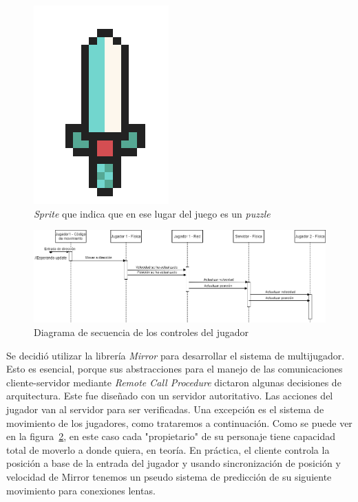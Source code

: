 \begin{figure}[H]
    \centering
    \includegraphics[scale=0.5]{images/espada_sprite.png}
    \caption{\textit{Sprite} que indica que en ese lugar del juego es un \textit{puzzle}}
    \label{fig:puzzle_location}
\end{figure}

\begin{figure}[H]
    \centering
    \includegraphics[width=1\linewidth]{images/diagrama_secuencia_movimientos.png}
    \caption{Diagrama de secuencia de los controles del jugador}
    \label{fig:diagrama_sec_movimiento}
\end{figure}

Se decidió utilizar la librería \textit{Mirror} para desarrollar el sistema de multijugador. Esto es esencial, porque sus abstracciones para el manejo de las comunicaciones cliente-servidor mediante \textit{Remote Call Procedure} dictaron algunas decisiones de arquitectura.
Este fue diseñado con un servidor autoritativo. Las acciones del jugador van al servidor para ser verificadas. Una excepción es el sistema de movimiento de los jugadores, como trataremos a continuación. Como se puede ver en la figura~\ref{fig:diagrama_sec_movimiento}, en este caso cada "propietario" de su personaje tiene capacidad total de moverlo a donde quiera, en teoría. En práctica, el cliente controla la posición a base de la entrada del jugador y usando sincronización de posición y velocidad de Mirror tenemos un pseudo sistema de predicción de su siguiente movimiento para conexiones lentas. 

